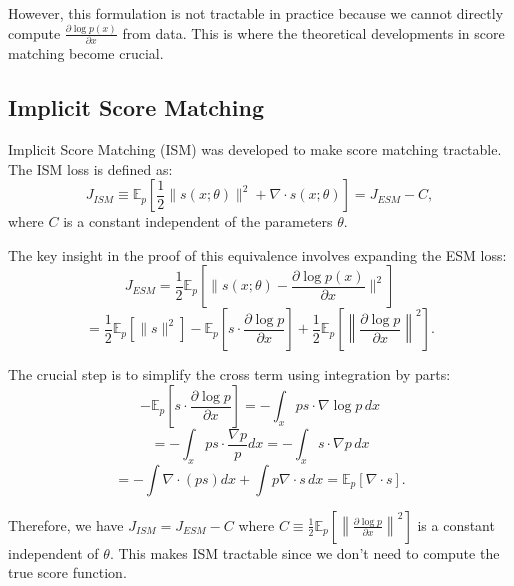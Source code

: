 However, this formulation is not tractable in practice because we cannot directly compute $\frac{\partial \log p(x)}{\partial x}$ from data. This is where the theoretical developments in score matching become crucial.

\subsection{Implicit Score Matching}

Implicit Score Matching (ISM) was developed to make score matching tractable. The ISM loss is defined as:
\begin{equation}
J_{ISM} \equiv \mathbb{E}_p\left[\frac{1}{2}\|s(x;\theta)\|^2 + \nabla\cdot s(x;\theta)\right] = J_{ESM} - C,
\end{equation}
where $C$ is a constant independent of the parameters $\theta$.

The key insight in the proof of this equivalence involves expanding the ESM loss:
\begin{equation}
J_{ESM} = \frac{1}{2} \mathbb{E}_p\left[\|s(x;\theta) - \frac{\partial \log p(x)}{\partial x}\|^2\right]
\end{equation}
\begin{equation}
= \frac{1}{2} \mathbb{E}_p\left[\|s\|^2\right] - \mathbb{E}_p\left[s \cdot \frac{\partial \log p}{\partial x}\right] + \frac{1}{2}\mathbb{E}_p\left[\left\|\frac{\partial \log p}{\partial x}\right\|^2\right].
\end{equation}

The crucial step is to simplify the cross term using integration by parts:
\begin{equation}
- \mathbb{E}_p\left[s \cdot \frac{\partial \log p}{\partial x}\right] = -\int_x ps \cdot \nabla \log p \, dx
\end{equation}
\begin{equation}
= -\int_x ps \cdot \frac{\nabla p}{p} dx = -\int_x s \cdot \nabla p \, dx
\end{equation}
\begin{equation}
= -\int \nabla \cdot (ps) dx + \int p \nabla \cdot s \, dx = \mathbb{E}_p[\nabla \cdot s].
\end{equation}

Therefore, we have $J_{ISM} = J_{ESM} - C$ where $C \equiv \frac{1}{2}\mathbb{E}_p\left[\left\|\frac{\partial \log p}{\partial x}\right\|^2\right]$ is a constant independent of $\theta$. This makes ISM tractable since we don't need to compute the true score function.

